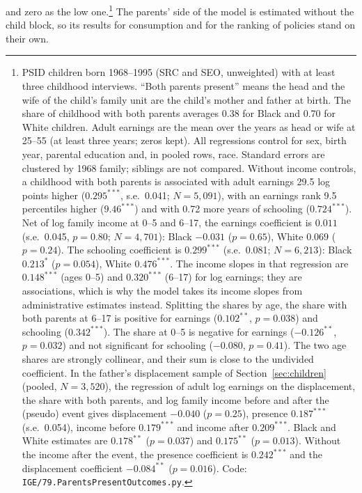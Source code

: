 and zero as the low one.\footnote{PSID children born 1968--1995 (SRC and SEO, unweighted) with at least three
childhood interviews. ``Both parents present'' means the head and the wife of the child's family unit are the child's
mother and father at birth. The share of childhood with both parents averages 0.38 for Black and 0.70 for White
children. Adult earnings are the mean over the years as head or wife at 25--55 (at least three years; zeros kept).
All regressions control for sex, birth year, parental education and, in pooled rows, race. Standard errors are
clustered by 1968 family; siblings are not compared. Without income controls, a childhood with both parents is
associated with adult earnings 29.5 log points higher ($0.295^{***}$, s.e.\ 0.041; $N=5{,}091$), with an earnings
rank 9.5 percentiles higher ($9.46^{***}$) and with 0.72 more years of schooling ($0.724^{***}$). Net of log family
income at 0--5 and 6--17, the earnings coefficient is $0.011$ (s.e.\ 0.045, $p=0.80$; $N=4{,}701$): Black $-0.031$
($p=0.65$), White $0.069$ ($p=0.24$). The schooling coefficient is $0.299^{***}$ (s.e.\ 0.081; $N=6{,}213$): Black
$0.213^{*}$ ($p=0.054$), White $0.476^{***}$. The income slopes in that regression are $0.148^{***}$ (ages 0--5) and
$0.320^{***}$ (6--17) for log earnings; they are associations, which is why the model takes its income slopes from
administrative estimates instead. Splitting the shares by age, the share with both parents at 6--17 is positive for earnings
($0.102^{**}$, $p=0.038$) and schooling ($0.342^{***}$). The share at 0--5 is negative for earnings ($-0.126^{**}$,
$p=0.032$) and not significant for schooling ($-0.080$, $p=0.41$). The two age shares are strongly collinear, and
their sum is close to the undivided coefficient. In the father's
displacement sample of Section~\ref{sec:children} (pooled, $N=3{,}520$), the regression of adult log earnings on the
displacement, the share with both parents, and log family income before and after the (pseudo) event gives
displacement $-0.040$ ($p=0.25$), presence $0.187^{***}$ (s.e.\ 0.054), income before $0.179^{***}$ and income after
$0.209^{***}$. Black and White estimates are $0.178^{**}$ ($p=0.037$) and $0.175^{**}$ ($p=0.013$). Without the
income after the event, the presence coefficient is $0.242^{***}$ and the displacement coefficient $-0.084^{**}$
($p=0.016$). Code: \texttt{IGE/79.ParentsPresentOutcomes.py}.} The parents' side of the model is estimated without
the child block, so its results for consumption and for the ranking of policies stand on their own.
